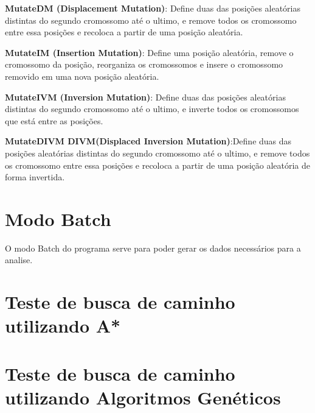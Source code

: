 \textbf{MutateDM (Displacement Mutation)}: Define duas das posições aleatórias distintas do segundo cromossomo até o ultimo, e remove todos os cromossomo entre essa posições e recoloca a partir de uma posição aleatória.

\textbf{MutateIM (Insertion Mutation)}: Define uma posição aleatória, remove o cromossomo da posição, reorganiza os cromossomos e insere o cromossomo removido em uma nova posição aleatória.

\textbf{MutateIVM (Inversion Mutation)}: Define duas das posições aleatórias distintas do segundo cromossomo até o ultimo, e inverte todos os cromossomos que está entre as posições.

\textbf{MutateDIVM DIVM(Displaced Inversion Mutation)}:Define duas das posições aleatórias distintas do segundo cromossomo até o ultimo, e remove todos os cromossomo entre essa posições e recoloca a partir de uma posição aleatória de forma invertida.

\section{Modo Batch}

O modo Batch do programa serve para poder gerar os dados necessários para a analise.

\section{Teste de busca de caminho utilizando A*}

\section{Teste de busca de caminho utilizando Algoritmos Genéticos}
